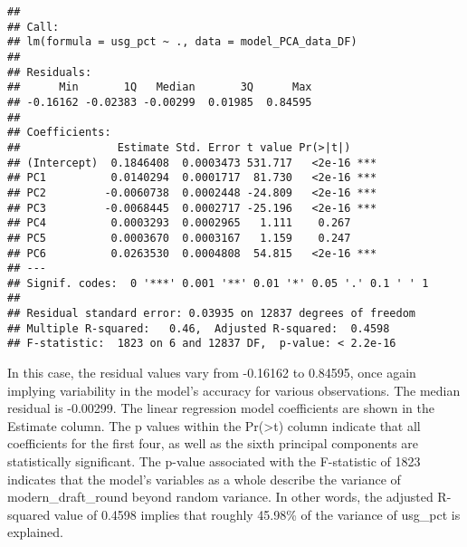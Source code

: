 \documentclass[
]{article}
\newenvironment{Shaded}{\begin{snugshade}}{\end{snugshade}}
\newcommand{\AttributeTok}[1]{\textcolor[rgb]{0.13,0.29,0.53}{#1}}
\newcommand{\DecValTok}[1]{\textcolor[rgb]{0.00,0.00,0.81}{#1}}
\newcommand{\FunctionTok}[1]{\textcolor[rgb]{0.13,0.29,0.53}{\textbf{#1}}}
\newcommand{\NormalTok}[1]{#1}
\newcommand{\OtherTok}[1]{\textcolor[rgb]{0.56,0.35,0.01}{#1}}
\newcommand{\SpecialCharTok}[1]{\textcolor[rgb]{0.81,0.36,0.00}{\textbf{#1}}}
\begin{document}
\begin{Shaded}
\end{Shaded}

\begin{verbatim}
## 
## Call:
## lm(formula = usg_pct ~ ., data = model_PCA_data_DF)
## 
## Residuals:
##      Min       1Q   Median       3Q      Max 
## -0.16162 -0.02383 -0.00299  0.01985  0.84595 
## 
## Coefficients:
##               Estimate Std. Error t value Pr(>|t|)    
## (Intercept)  0.1846408  0.0003473 531.717   <2e-16 ***
## PC1          0.0140294  0.0001717  81.730   <2e-16 ***
## PC2         -0.0060738  0.0002448 -24.809   <2e-16 ***
## PC3         -0.0068445  0.0002717 -25.196   <2e-16 ***
## PC4          0.0003293  0.0002965   1.111    0.267    
## PC5          0.0003670  0.0003167   1.159    0.247    
## PC6          0.0263530  0.0004808  54.815   <2e-16 ***
## ---
## Signif. codes:  0 '***' 0.001 '**' 0.01 '*' 0.05 '.' 0.1 ' ' 1
## 
## Residual standard error: 0.03935 on 12837 degrees of freedom
## Multiple R-squared:   0.46,  Adjusted R-squared:  0.4598 
## F-statistic:  1823 on 6 and 12837 DF,  p-value: < 2.2e-16
\end{verbatim}

In this case, the residual values vary from -0.16162 to 0.84595, once
again implying variability in the model's accuracy for various
observations. The median residual is -0.00299. The linear regression
model coefficients are shown in the Estimate column. The p values within
the Pr(\textgreater\textbar t\textbar) column indicate that all
coefficients for the first four, as well as the sixth principal
components are statistically significant. The p-value associated with
the F-statistic of 1823 indicates that the model's variables as a whole
describe the variance of modern\_draft\_round beyond random variance. In
other words, the adjusted R-squared value of 0.4598 implies that roughly
45.98\% of the variance of usg\_pct is explained.
\end{document}
